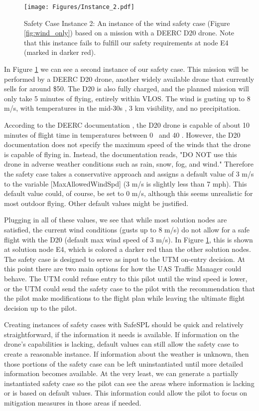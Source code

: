 \begin{figure}[ht]
    \centering
    \texttt{[image: Figures/Instance\_2.pdf]}
    \caption{Safety Case Instance 2: An instance of the wind safety case (Figure \ref{fig:wind_only}) based on a mission with a DEERC D20 drone. Note that this instance fails to fulfill our safety requirements at node E4 (marked in darker red).}
    \label{fig:instance_2}
\end{figure}

In Figure \ref{fig:instance_2} we can see a second instance of our safety case. This mission will be performed by a DEERC D20 drone, another widely available drone that currently sells for around \$50. The D20 is also fully charged, and the planned mission will only take 5 minutes of flying, entirely within VLOS. The wind is gusting up to 8 m/s, with temperatures in the mid-30s \textcelsius, 3 km visibility, and no precipitation.

According to the DEERC documentation \cite{DEERCD20}, the D20 drone is capable of about 10 minutes of flight time in temperatures between 0 \textcelsius \ and 40 \textcelsius. However, the D20 documentation does not specify the maximum speed of the winds that the drone is capable of flying in. Instead, the documentation reads, "DO NOT use this drone in adverse weather conditions such as rain, snow, fog, and wind." Therefore the safety case takes a conservative approach and assigns a default value of 3 m/s to the variable [MaxAllowedWindSpd] (3 m/s is slightly less than 7 mph). This default value could, of course, be set to 0 m/s, although this seems unrealistic for most outdoor flying. Other default values might be justified.

Plugging in all of these values, we see that while most solution nodes are satisfied, the current wind conditions (gusts up to 8 m/s) do not allow for a safe flight with the D20 (default max wind speed of 3 m/s). In Figure \ref{fig:instance_2}, this is shown at solution node E4, which is colored a darker red than the other solution nodes. The safety case is designed to serve as input to the UTM on-entry decision. At this point there are two main options for how the UAS Traffic Manager could behave. The UTM could refuse entry to this pilot until the wind speed is lower, or the UTM could send the safety case to the pilot with the recommendation that the pilot make modifications to the flight plan while leaving the ultimate flight decision up to the pilot.

Creating instances of safety cases with SafeSPL should be quick and relatively straightforward, if the information it needs is available. If information on the drone's capabilities is lacking, default values can still allow the safety case to create a reasonable instance. If information about the weather is unknown, then those portions of the safety case can be left uninstantiated until more detailed information becomes available. At the very least, we can generate a partially instantiated safety case so the pilot can see the areas where information is lacking or is based on default values. This information could allow the pilot to focus on mitigation measures in those areas if needed. 

